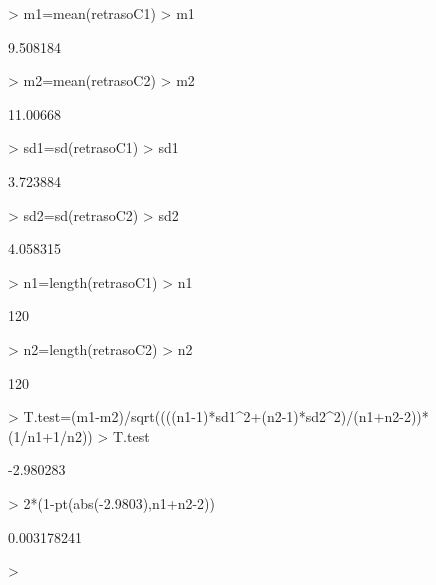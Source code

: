 \documentclass[10pt]{article}
\begin{document}
{\begin{Schunk}
\begin{Sinput}
> m1=mean(retrasoC1)
> m1
\end{Sinput}
\begin{Soutput}
[1] 9.508184
\end{Soutput}
\begin{Sinput}
> m2=mean(retrasoC2)
> m2
\end{Sinput}
\begin{Soutput}
[1] 11.00668
\end{Soutput}
\begin{Sinput}
> sd1=sd(retrasoC1)
> sd1
\end{Sinput}
\begin{Soutput}
[1] 3.723884
\end{Soutput}
\begin{Sinput}
> sd2=sd(retrasoC2)
> sd2
\end{Sinput}
\begin{Soutput}
[1] 4.058315
\end{Soutput}
\begin{Sinput}
> n1=length(retrasoC1)
> n1
\end{Sinput}
\begin{Soutput}
[1] 120
\end{Soutput}
\begin{Sinput}
> n2=length(retrasoC2)
> n2
\end{Sinput}
\begin{Soutput}
[1] 120
\end{Soutput}
\begin{Sinput}
> T.test=(m1-m2)/sqrt((((n1-1)*sd1^2+(n2-1)*sd2^2)/(n1+n2-2))*(1/n1+1/n2))
> T.test
\end{Sinput}
\begin{Soutput}
[1] -2.980283
\end{Soutput}
\begin{Sinput}
> 2*(1-pt(abs(-2.9803),n1+n2-2))
\end{Sinput}
\begin{Soutput}
[1] 0.003178241
\end{Soutput}
\begin{Sinput}
> 
\end{Sinput}
\end{Schunk}




}
\fi



\end{document}
